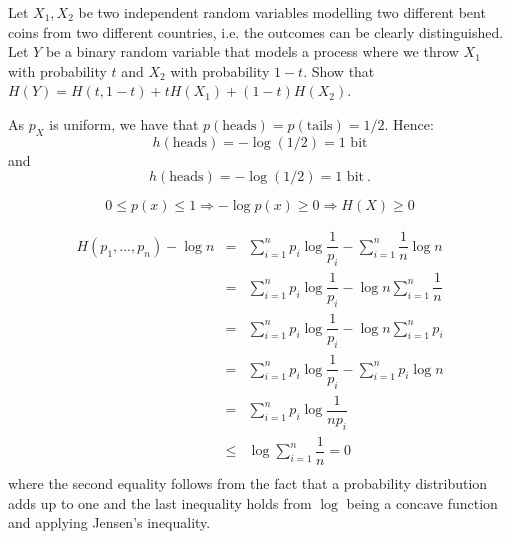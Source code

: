 \begin{exercise}\label{ex:telescopic}
Let $X_1,X_2$ be two independent random variables modelling two different bent coins from two different countries, i.e. the outcomes can be clearly distinguished.
Let $Y$ be a binary random variable that models a process where we throw $X_1$ with probability $t$ and $X_2$ with probability $1-t$. 
Show that $H(Y)= H(t,1-t)+tH(X_1)+(1-t)H(X_2)$.
\end{exercise}
\begin{solution}
As $p_X$ is uniform, we have that $p(\text{heads})=p(\text{tails})=1/2$. Hence:
\begin{equation*}
h(\text{heads})=-\log(1/2)=1\text{ bit}
\end{equation*}
and
\begin{equation*}
h(\text{heads})=-\log(1/2)=1\text{ bit}\ .
\end{equation*}
\end{solution}
\begin{solution}
  \begin{equation}
    0 \leq p(x) \leq 1 \Rightarrow -\log p(x) \geq 0 \Rightarrow H(X) \geq 0
  \end{equation}
\end{solution}
\begin{solution}
\begin{eqnarray}
H(p_1, ..., p_n)  - \log n & =      & \sum_{i=1}^n p_i \log \dfrac{1}{p_i} - \sum_{i=1}^n \dfrac{1}{n} \log n \nonumber \\
                                       & =      & \sum_{i=1}^n p_i \log \dfrac{1}{p_i} - \log n \sum_{i=1}^n \dfrac{1}{n} \nonumber \\
                                       & =      & \sum_{i=1}^n p_i \log \dfrac{1}{p_i} - \log n \sum_{i=1}^n p_i \nonumber \\
                                       & =      & \sum_{i=1}^n p_i \log \dfrac{1}{p_i} - \sum_{i=1}^n p_i \log n \nonumber \\
                                       & =      & \sum_{i=1}^n p_i \log \dfrac{1}{np_i} \nonumber \\                                      
                                       & \leq &  \log \sum_{i=1}^n \dfrac{1}{n} = 0\nonumber \\
\end{eqnarray}
\noindent where the second equality follows from the fact that a probability distribution adds up to one and the last inequality holds from $\log$ being a concave function and applying Jensen's inequality.
\end{solution}
